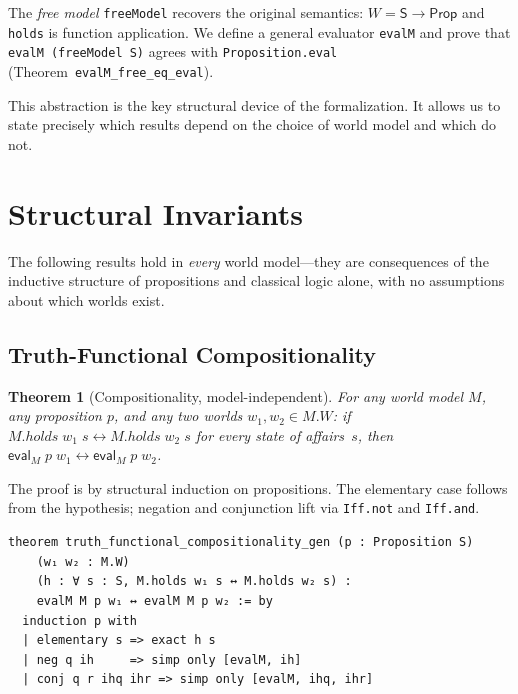 \documentclass[jsl,bibother]{asl}
\newtheorem{theorem}{Theorem}[section]
\theoremstyle{definition}
\theoremstyle{remark}
\newcommand{\Sach}{\mathsf{S}}
\newcommand{\Prop}{\mathsf{Prop}}
\newcommand{\eval}{\mathsf{eval}}
\begin{document}
\noindent
The \emph{free model} \texttt{freeModel} recovers the original
semantics: $W = \Sach \to \Prop$ and \texttt{holds} is function
application.  We define a general evaluator \texttt{evalM} and
prove that \texttt{evalM (freeModel S)} agrees with
\texttt{Proposition.eval} (Theorem~\texttt{evalM\_free\_eq\_eval}).

This abstraction is the key structural device of the
formalization.  It allows us to state precisely which results
depend on the choice of world model and which do not.

\section{Structural Invariants}
\label{sec:invariants}

The following results hold in \emph{every} world model---they
are consequences of the inductive structure of propositions and
classical logic alone, with no assumptions about which worlds
exist.

\subsection{Truth-Functional Compositionality}
\label{sec:compositionality}

\begin{theorem}[Compositionality, model-independent]
\label{thm:compositionality}
For any world model $M$, any proposition $p$, and any two
worlds $w_1, w_2 \in M.W$: if $M.\mathit{holds}\;w_1\;s
\leftrightarrow M.\mathit{holds}\;w_2\;s$ for every state of
affairs~$s$, then $\eval_M\;p\;w_1 \leftrightarrow
\eval_M\;p\;w_2$.
\end{theorem}

\noindent
The proof is by structural induction on propositions.
The elementary case follows from the hypothesis; negation and
conjunction lift via \texttt{Iff.not} and \texttt{Iff.and}.

\begin{lstlisting}
theorem truth_functional_compositionality_gen (p : Proposition S)
    (w₁ w₂ : M.W)
    (h : ∀ s : S, M.holds w₁ s ↔ M.holds w₂ s) :
    evalM M p w₁ ↔ evalM M p w₂ := by
  induction p with
  | elementary s => exact h s
  | neg q ih     => simp only [evalM, ih]
  | conj q r ihq ihr => simp only [evalM, ihq, ihr]
\end{lstlisting}
\end{document}
